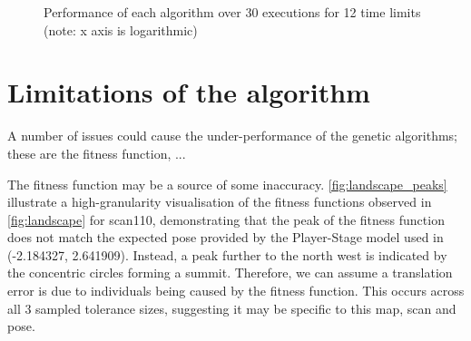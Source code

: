 \documentclass[authoryearcitations]{UoYCSproject}
\begin{document}
\begin{figure}
	\caption[Global-ICP performance against Grid Initialisation] {Performance of each algorithm over 30 executions for 12 time limits (note: x axis is logarithmic)}
	\label{fig:icp_vs_elite_vs_grid_box_whiskers}
\end{figure}






\section{Limitations of the algorithm}
\label{sec:algorithm_limitations}
A number of issues could cause the under-performance of the genetic algorithms; these are the fitness function, ...


The fitness function may be a source of some inaccuracy. \autoref{fig:landscape_peaks} illustrate a high-granularity visualisation of the fitness functions observed in \autoref{fig:landscape} for scan110, demonstrating that the peak of the fitness function does not match the expected pose provided by the Player-Stage model used in \citet{Lenac2011-co}(-2.184327, 2.641909). Instead, a peak further to the north west is indicated by the concentric circles forming a summit. Therefore, we can assume a translation error is due to individuals being caused by the fitness function. This occurs across all 3 sampled tolerance sizes, suggesting it may be specific to this map, scan and pose.
\end{document}
